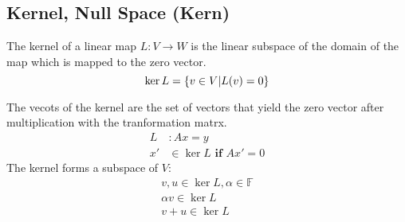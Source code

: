 \documentclass{book}
\begin{document}
\subsection{Kernel, Null Space (Kern)}\label{kernel}
The kernel of a linear map \(L: V \rightarrow W \) is the linear subspace of the domain of the map which is mapped to the zero vector.
\begin{equation}
    \ker L = \{ v \in V | L(v) = 0 \} \\
\end{equation}

The vecots of the kernel are the set of vectors that yield the zero vector after multiplication with the tranformation matrx.
\begin{align*}
    L  & : Ax = y                          \\
    x' & \in \ker L  \textbf{ if } Ax' = 0
\end{align*}
The kernel forms a subspace of \( V \):
\begin{align*}
    v, u \in \ker L, \alpha \in \mathbb{F} \\
    \alpha v \in \ker L                    \\
    v + u \in \ker L                       \\
\end{align*}
\end{document}
